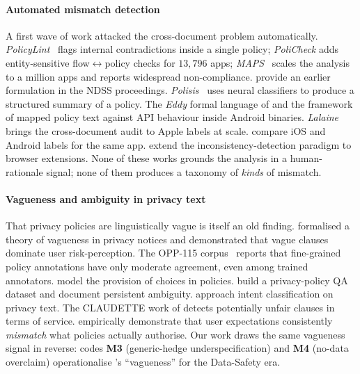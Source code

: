 \documentclass[11pt,a4paper]{article}
\newcommand{\code}[1]{\textsf{\textbf{#1}}}
\begin{document}
\paragraph{Automated mismatch detection}
A first wave of work attacked the cross-document problem
automatically. \emph{PolicyLint}~\citep{andow2019policylint} flags
internal contradictions inside a single policy; \emph{PoliCheck}
\citep{andow2020policheck} adds entity-sensitive flow$\leftrightarrow$policy
checks for $13{,}796$ apps; \emph{MAPS}~\citep{zimmeck2019maps} scales
the analysis to a million apps and reports widespread non-compliance.
\citet{zimmeck2017automated} provide an earlier formulation in the NDSS
proceedings. \emph{Polisis}~\citep{harkous2018polisis} uses neural
classifiers to produce a structured summary of a policy. The
\emph{Eddy} formal language of \citet{breaux2014eddy} and the framework
of \citet{slavin2016toward} mapped policy text against API behaviour
inside Android binaries. \emph{Lalaine}~\citep{xiao2023lalaine} brings
the cross-document audit to Apple labels at scale.
\citet{khandelwal2023comparing} compare iOS and Android labels for the
same app.
\citet{bui2023detection} extend the inconsistency-detection paradigm to
browser extensions. None of these works grounds the analysis in a
human-rationale signal; none of them produces a taxonomy of
\emph{kinds} of mismatch.

\paragraph{Vagueness and ambiguity in privacy text}
That privacy policies are linguistically vague is itself an old finding.
\citet{bhatia2016theory} formalised a theory of vagueness in privacy
notices and demonstrated that vague clauses dominate user
risk-perception. The OPP-115 corpus~\citep{wilson2016creation} reports
that fine-grained policy annotations have only moderate agreement, even
among trained annotators. \citet{sathyendra2017identifying} model the
provision of choices in policies. \citet{ravichander2019question}
build a privacy-policy QA dataset and document persistent ambiguity.
\citet{ahmad2021intent} approach intent classification on privacy text.
The CLAUDETTE work of \citet{lippi2019claudette} detects potentially
unfair clauses in terms of service. \citet{rao2016expecting}
empirically demonstrate that user expectations consistently
\emph{mismatch} what policies actually authorise. Our work draws the
same vagueness signal in reverse: codes \code{M3} (generic-hedge
underspecification) and \code{M4} (no-data overclaim) operationalise
\citeauthor{bhatia2016theory}'s ``vagueness'' for the Data-Safety era.
\end{document}
